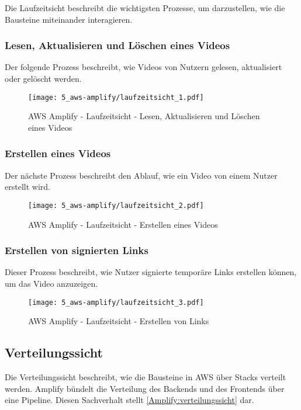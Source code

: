 Die Laufzeitsicht beschreibt die wichtigsten Prozesse, um darzustellen, wie die Bausteine miteinander interagieren.

\subsubsection{Lesen, Aktualisieren und Löschen eines Videos}

Der folgende Prozess beschreibt, wie Videos von Nutzern gelesen, aktualisiert oder gelöscht werden.

\begin{figure}
  \centering
  \texttt{[image: 5\_aws-amplify/laufzeitsicht\_1.pdf]}
  \caption{AWS Amplify - Laufzeitsicht - Lesen, Aktualisieren und Löschen eines Videos}
  \label{Amplify:laufzeitsicht1}
\end{figure}

\subsubsection{Erstellen eines Videos}

Der nächste Prozess beschreibt den Ablauf, wie ein Video von einem Nutzer erstellt wird.

\begin{figure}
  \centering
  \texttt{[image: 5\_aws-amplify/laufzeitsicht\_2.pdf]}
  \caption{AWS Amplify - Laufzeitsicht - Erstellen eines Videos}
  \label{Amplify:laufzeitsicht2}
\end{figure}

\subsubsection{Erstellen von signierten Links}

Dieser Prozess beschreibt, wie Nutzer signierte temporäre Links erstellen können, um das Video anzuzeigen.

\begin{figure}
  \centering
  \texttt{[image: 5\_aws-amplify/laufzeitsicht\_3.pdf]}
  \caption{AWS Amplify - Laufzeitsicht - Erstellen von Links}
  \label{Amplify:laufzeitsicht3}
\end{figure}

\subsection{Verteilungssicht}

Die Verteilungssicht beschreibt, wie die Bausteine in \ac{AWS} über Stacks verteilt werden. Amplify bündelt die Verteilung des Backends und des Frontends über eine Pipeline. Diesen Sachverhalt stellt \autoref{Amplify:verteilungssicht} dar.

